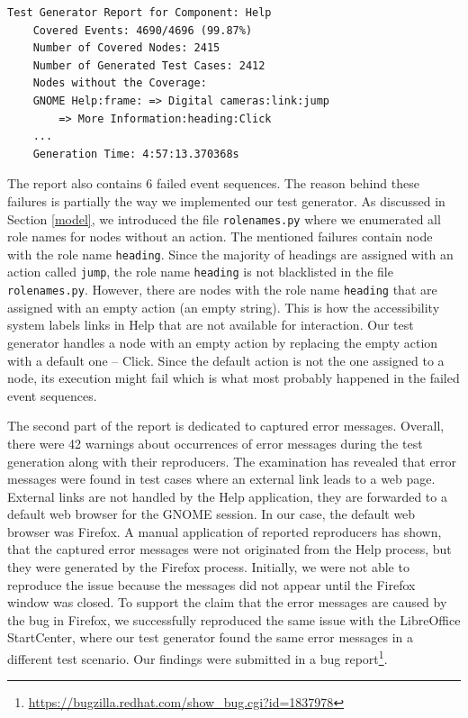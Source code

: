 \begin{lstlisting}[caption={
The final test generator report for GNOME Help},label={yelp-report}]
    Test Generator Report for Component: Help
    Covered Events: 4690/4696 (99.87%)
    Number of Covered Nodes: 2415
    Number of Generated Test Cases: 2412
    Nodes without the Coverage:
    GNOME Help:frame: => Digital cameras:link:jump 
        => More Information:heading:Click
    ...
    Generation Time: 4:57:13.370368s
\end{lstlisting}

The report also contains 6 failed event sequences. The reason behind these failures is partially the way we implemented our test generator. As discussed in Section \ref{model}, we introduced the file \texttt{rolenames.py} where we enumerated all role names for nodes without an action. The mentioned failures contain node with the role name \texttt{heading}. Since the majority of headings are assigned with an action called \texttt{jump}, the role name \texttt{heading} is not blacklisted in the file \texttt{rolenames.py}. However, there are nodes with the role name \texttt{heading} that are assigned with an empty action (an empty string). This is how the accessibility system labels links in Help that are not available for interaction. Our test generator handles a node with an empty action by replacing the empty action with a default one -- Click. Since the default action is not the one assigned to a node, its execution might fail which is what most probably happened in the failed event sequences. 

The second part of the report is dedicated to captured error messages. Overall, there were 42 warnings about occurrences of error messages during the test generation along with their reproducers. The examination has revealed that error messages were found in test cases where an external link leads to a web page. External links are not handled by the Help application, they are forwarded to a default web browser for the GNOME session. In our case, the default web browser was Firefox. A manual application of reported reproducers has shown, that the captured error messages were not originated from the Help process, but they were generated by the Firefox process. Initially, we were not able to reproduce the issue because the messages did not appear until the Firefox window was closed. To support the claim that the error messages are caused by the bug in Firefox, we successfully reproduced the same issue with the LibreOffice StartCenter, where our test generator found the same error messages in a different test scenario. Our findings were submitted in a bug report\footnote{\url{https://bugzilla.redhat.com/show_bug.cgi?id=1837978}}. 

